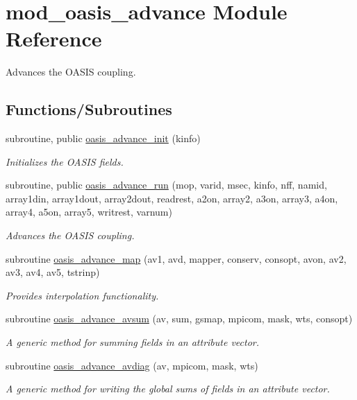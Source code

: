 \hypertarget{namespacemod__oasis__advance}{}\section{mod\+\_\+oasis\+\_\+advance Module Reference}
\label{namespacemod__oasis__advance}


Advances the O\+A\+S\+IS coupling.  


\subsection*{Functions/\+Subroutines}
\begin{DoxyCompactItemize}
\item 
subroutine, public \hyperlink{namespacemod__oasis__advance_a480bfe5b333300c1084af8f9c239a81d}{oasis\+\_\+advance\+\_\+init} (kinfo)
\begin{DoxyCompactList}\small\item\em Initializes the O\+A\+S\+IS fields. \end{DoxyCompactList}\item 
subroutine, public \hyperlink{namespacemod__oasis__advance_a932b0cbe5d1f5fa27c283c6472be7baf}{oasis\+\_\+advance\+\_\+run} (mop, varid, msec, kinfo, nff, namid, array1din, array1dout, array2dout, readrest, a2on, array2, a3on, array3, a4on, array4, a5on, array5, writrest, varnum)
\begin{DoxyCompactList}\small\item\em Advances the O\+A\+S\+IS coupling. \end{DoxyCompactList}\item 
subroutine \hyperlink{namespacemod__oasis__advance_a0514c843d051b8ee16adfb349eaee6a7}{oasis\+\_\+advance\+\_\+map} (av1, avd, mapper, conserv, consopt, avon, av2, av3, av4, av5, tstrinp)
\begin{DoxyCompactList}\small\item\em Provides interpolation functionality. \end{DoxyCompactList}\item 
subroutine \hyperlink{namespacemod__oasis__advance_acf8f4a02082ba2d9f32f0835ad14e11d}{oasis\+\_\+advance\+\_\+avsum} (av, sum, gsmap, mpicom, mask, wts, consopt)
\begin{DoxyCompactList}\small\item\em A generic method for summing fields in an attribute vector. \end{DoxyCompactList}\item 
subroutine \hyperlink{namespacemod__oasis__advance_af611b26fe4601ded488fd5d3c03b12a2}{oasis\+\_\+advance\+\_\+avdiag} (av, mpicom, mask, wts)
\begin{DoxyCompactList}\small\item\em A generic method for writing the global sums of fields in an attribute vector. \end{DoxyCompactList}\end{DoxyCompactItemize}
